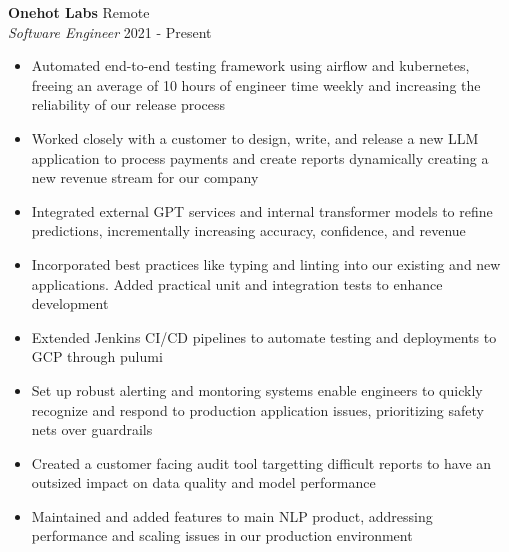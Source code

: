\documentclass[a4paper]{article}
\begin{document}
\textbf{Onehot Labs} \hfill Remote\\
\textit{Software Engineer} \hfill 2021 - Present\\
\vspace{-1mm}
\begin{itemize} \itemsep 1pt
  \item Automated end-to-end testing framework using airflow and kubernetes, freeing an average of 10 hours of engineer time weekly and increasing the reliability of our release process
  \item Worked closely with a customer to design, write, and release a new LLM application to process payments and create reports dynamically creating a new revenue stream for our company
  \item Integrated external GPT services and internal transformer models to refine predictions, incrementally increasing accuracy, confidence, and revenue
  \item Incorporated best practices like typing and linting into our existing and new applications. Added practical unit and integration tests to enhance development
  \item Extended Jenkins CI/CD pipelines to automate testing and deployments to GCP through pulumi
  \item Set up robust alerting and montoring systems enable engineers to quickly recognize and respond to production application issues, prioritizing safety nets over guardrails
  \item Created a customer facing audit tool targetting difficult reports to have an outsized impact on data quality and model performance
  \item Maintained and added features to main NLP product, addressing performance and scaling issues in our production environment

\end{itemize}
\end{document}

